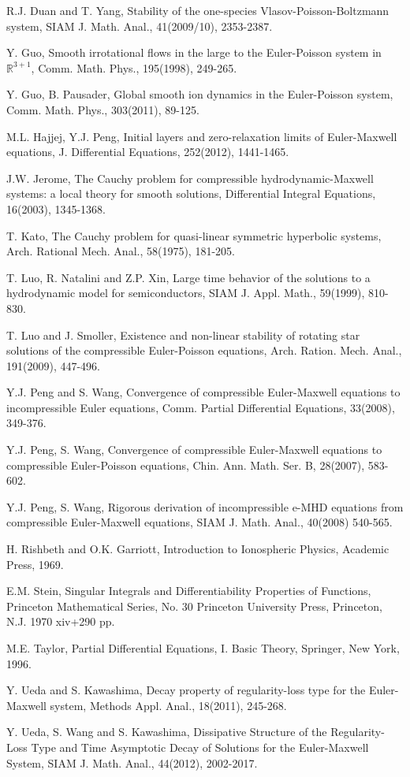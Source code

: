 \documentclass[11pt]{amsart}
\numberwithin{equation}{section}
\begin{document}
\begin{thebibliography}{99}
 R.J. Duan and T. Yang, Stability of the one-species Vlasov-Poisson-Boltzmann
system, SIAM J. Math. Anal., 41(2009/10), 2353-2387.

   Y. Guo, Smooth irrotational flows in the large to the Euler-Poisson system in $\mathbb{R}^{3+1}$,
Comm. Math. Phys., 195(1998), 249-265.

 Y. Guo, B. Pausader, Global smooth ion dynamics in the Euler-Poisson
system, Comm. Math. Phys., 303(2011), 89-125.

 M.L. Hajjej, Y.J. Peng, Initial layers and zero-relaxation limits of Euler-Maxwell
equations, J. Differential Equations, 252(2012), 1441-1465.

 J.W. Jerome, The Cauchy problem for compressible hydrodynamic-Maxwell
systems: a local theory for smooth solutions, Differential Integral
Equations, 16(2003), 1345-1368.

  T. Kato, The Cauchy problem for quasi-linear symmetric hyperbolic systems, Arch.
Rational Mech. Anal., 58(1975), 181-205.

 T. Luo, R. Natalini and Z.P. Xin, Large time behavior of the solutions to a
 hydrodynamic model for semiconductors, SIAM J. Appl. Math., 59(1999), 810-830.

T. Luo and J. Smoller, Existence and non-linear stability
of rotating star solutions of the compressible Euler-Poisson
equations, Arch. Ration. Mech. Anal., 191(2009), 447-496.

Y.J. Peng and S. Wang, Convergence of compressible Euler-Maxwell equations to
incompressible Euler equations, Comm. Partial Differential
Equations, 33(2008), 349-376.

 Y.J. Peng, S. Wang, Convergence of compressible Euler-Maxwell
equations to compressible Euler-Poisson equations, Chin. Ann. Math.
Ser. B, 28(2007), 583-602.

Y.J. Peng, S. Wang, Rigorous
derivation of incompressible e-MHD equations from compressible
Euler-Maxwell equations, SIAM J. Math. Anal., 40(2008) 540-565.

 H. Rishbeth and O.K. Garriott,
Introduction to Ionospheric Physics, Academic Press, 1969.

  E.M. Stein, Singular Integrals and Differentiability Properties of
Functions, Princeton Mathematical Series, No. 30 Princeton
University Press, Princeton, N.J. 1970 xiv+290 pp.

  M.E. Taylor, Partial Differential Equations, I. Basic Theory, Springer, New York,
1996.

Y. Ueda and S. Kawashima, {Decay property of regularity-loss type
for the Euler-Maxwell system}, Methods Appl. Anal., 18(2011),
245-268.

Y. Ueda, S. Wang and S. Kawashima, {Dissipative Structure of the
Regularity-Loss Type and Time Asymptotic Decay of Solutions for the
Euler-Maxwell System}, SIAM J. Math. Anal., 44(2012), 2002-2017.

\end{thebibliography}
\end{document}
